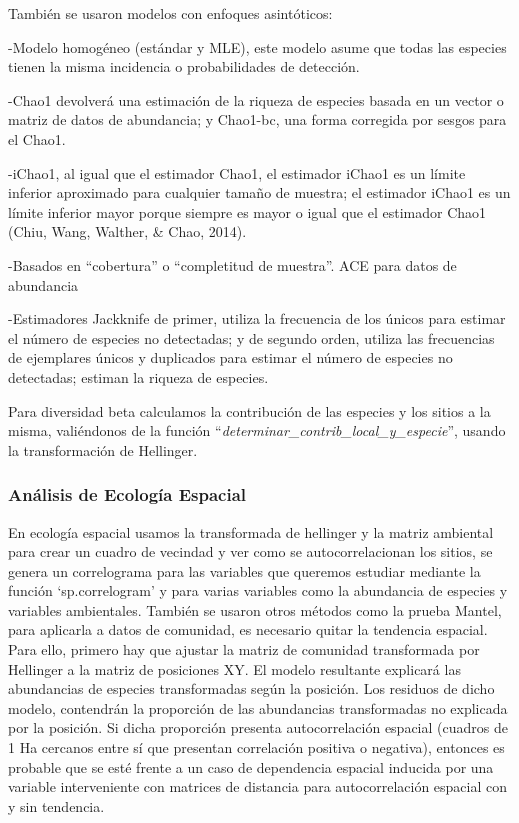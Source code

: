 \documentclass[11pt,]{article}
\begin{document}
También se usaron modelos con enfoques asintóticos:

-Modelo homogéneo (estándar y MLE), este modelo asume que todas las
especies tienen la misma incidencia o probabilidades de detección.

-Chao1 devolverá una estimación de la riqueza de especies basada en un
vector o matriz de datos de abundancia; y Chao1-bc, una forma corregida
por sesgos para el Chao1.

-iChao1, al igual que el estimador Chao1, el estimador iChao1 es un
límite inferior aproximado para cualquier tamaño de muestra; el
estimador iChao1 es un límite inferior mayor porque siempre es mayor o
igual que el estimador Chao1 (Chiu, Wang, Walther, \& Chao, 2014).

-Basados en ``cobertura'' o ``completitud de muestra''. ACE para datos
de abundancia

-Estimadores Jackknife de primer, utiliza la frecuencia de los únicos
para estimar el número de especies no detectadas; y de segundo orden,
utiliza las frecuencias de ejemplares únicos y duplicados para estimar
el número de especies no detectadas; estiman la riqueza de especies.

Para diversidad beta calculamos la contribución de las especies y los
sitios a la misma, valiéndonos de la función
``\emph{determinar\_contrib\_local\_y\_especie}'', usando la
transformación de Hellinger.

\subsubsection{Análisis de Ecología
Espacial}\label{anuxe1lisis-de-ecologuxeda-espacial}

En ecología espacial usamos la transformada de hellinger y la matriz
ambiental para crear un cuadro de vecindad y ver como se
autocorrelacionan los sitios, se genera un correlograma para las
variables que queremos estudiar mediante la función `sp.correlogram' y
para varias variables como la abundancia de especies y variables
ambientales. También se usaron otros métodos como la prueba Mantel, para
aplicarla a datos de comunidad, es necesario quitar la tendencia
espacial. Para ello, primero hay que ajustar la matriz de comunidad
transformada por Hellinger a la matriz de posiciones XY. El modelo
resultante explicará las abundancias de especies transformadas según la
posición. Los residuos de dicho modelo, contendrán la proporción de las
abundancias transformadas no explicada por la posición. Si dicha
proporción presenta autocorrelación espacial (cuadros de 1 Ha cercanos
entre sí que presentan correlación positiva o negativa), entonces es
probable que se esté frente a un caso de dependencia espacial inducida
por una variable interveniente con matrices de distancia para
autocorrelación espacial con y sin tendencia.
\end{document}
